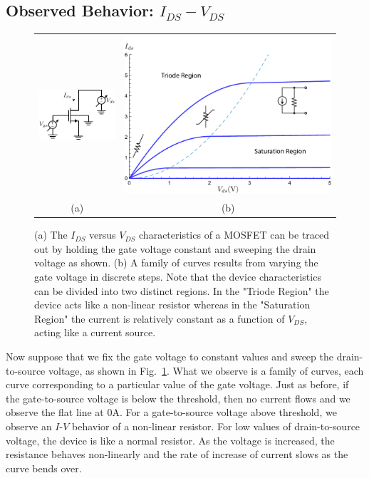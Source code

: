 \subsection{Observed Behavior: \texorpdfstring{$I_{DS} - V_{DS}$}{Drain Current vs. Drain Voltage}}
\begin{figure}[tb]
\centering
\begin{tabular}{cc}
\includegraphics[width=.3\columnwidth]{idvds_sweep} &
\includegraphics[width=.6\columnwidth]{ids_vds}\\
(a) & (b)\\
\end{tabular}
\caption{(a) The $I_{DS}$ versus $V_{DS}$ characteristics of a MOSFET can be traced out by holding the gate voltage constant and sweeping the drain voltage as shown.  (b) A family of curves results from varying the gate voltage in discrete steps.  Note that the device characteristics can be divided into two distinct regions.  In the "Triode Region" the device acts like a non-linear resistor whereas in the "Saturation Region" the current is relatively constant as a function of $V_{DS}$, acting like a current source.}
\label{fig:ids_vds}
\end{figure}
Now suppose that we fix the gate voltage to constant values and sweep the drain-to-source voltage, as shown in Fig.~\ref{fig:ids_vds}.  What we observe is a family of curves, each curve corresponding to a particular value of the gate voltage.  Just as before, if the gate-to-source voltage is below the threshold, then no current flows and we observe the flat line at $0$A. For a gate-to-source voltage above threshold, we observe an $I$-$V$ behavior of a non-linear resistor.  For low values of drain-to-source voltage, the device is like a normal resistor. As the voltage is increased, the resistance behaves non-linearly and the rate of increase of current slows as the curve bends over.  
